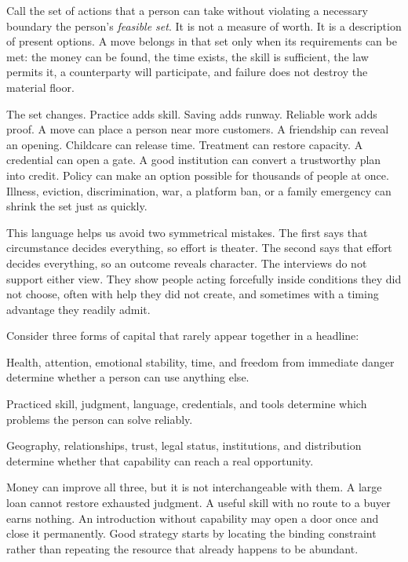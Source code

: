 Call the set of actions that a person can take without violating a necessary
boundary the person's \emph{feasible set}. It is not a measure of worth. It is
a description of present options. A move belongs in that set only when its
requirements can be met: the money can be found, the time exists, the skill is
sufficient, the law permits it, a counterparty will participate, and failure
does not destroy the material floor.

The set changes. Practice adds skill. Saving adds runway. Reliable work adds
proof. A move can place a person near more customers. A friendship can reveal
an opening. Childcare can release time. Treatment can restore capacity. A
credential can open a gate. A good institution can convert a trustworthy plan
into credit. Policy can make an option possible for thousands of people at
once. Illness, eviction, discrimination, war, a platform ban, or a family
emergency can shrink the set just as quickly.

This language helps us avoid two symmetrical mistakes. The first says that
circumstance decides everything, so effort is theater. The second says that
effort decides everything, so an outcome reveals character. The interviews do
not support either view. They show people acting forcefully inside conditions
they did not choose, often with help they did not create, and sometimes with a
timing advantage they readily admit.

Consider three forms of capital that rarely appear together in a headline:

\begin{description}[leftmargin=2.2em,style=nextline]
\item[Capacity] Health, attention, emotional stability, time, and freedom from
  immediate danger determine whether a person can use anything else.
\item[Capability] Practiced skill, judgment, language, credentials, and tools
  determine which problems the person can solve reliably.
\item[Access] Geography, relationships, trust, legal status, institutions, and
  distribution determine whether that capability can reach a real opportunity.
\end{description}

Money can improve all three, but it is not interchangeable with them. A large
loan cannot restore exhausted judgment. A useful skill with no route to a
buyer earns nothing. An introduction without capability may open a door once
and close it permanently. Good strategy starts by locating the binding
constraint rather than repeating the resource that already happens to be
abundant.

